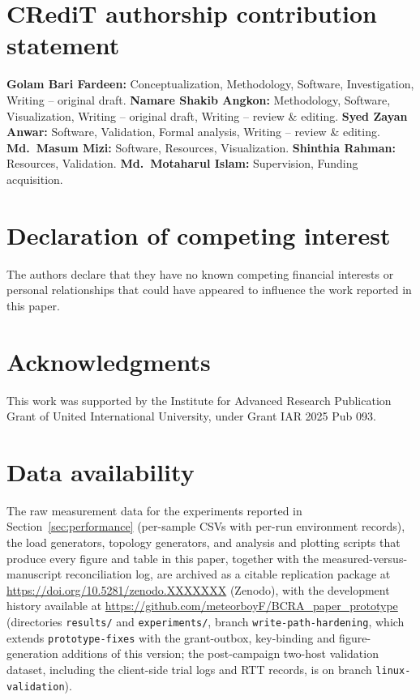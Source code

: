 \documentclass[preprint,12pt]{elsarticle}
\begin{document}
\section*{CRediT authorship contribution statement}
\textbf{Golam Bari Fardeen:} Conceptualization, Methodology, Software,
Investigation, Writing -- original draft.
\textbf{Namare Shakib Angkon:} Methodology, Software, Visualization,
Writing -- original draft, Writing -- review \& editing.
\textbf{Syed Zayan Anwar:} Software, Validation, Formal analysis,
Writing -- review \& editing.
\textbf{Md.\ Masum Mizi:} Software, Resources, Visualization.
\textbf{Shinthia Rahman:} Resources, Validation.
\textbf{Md.\ Motaharul Islam:} Supervision, Funding acquisition.

\section*{Declaration of competing interest}
The authors declare that they have no known competing financial interests
or personal relationships that could have appeared to influence the work
reported in this paper.

\section*{Acknowledgments}
This work was supported by the Institute for Advanced Research Publication
Grant of United International University, under Grant IAR 2025 Pub 093.

\section*{Data availability}
The raw measurement data for the experiments reported in
Section~\ref{sec:performance} (per-sample CSVs with per-run environment
records), the load generators, topology generators, and analysis and plotting
scripts that produce every figure and table in this paper, together with the
measured-versus-manuscript reconciliation log, are archived as a citable
replication package at
\url{https://doi.org/10.5281/zenodo.XXXXXXX} (Zenodo), with the
development history available at
\url{https://github.com/meteorboyF/BCRA_paper_prototype}
(directories \texttt{results/} and \texttt{experiments/}, branch
\texttt{write-path-hardening}, which extends \texttt{prototype-fixes} with the
grant-outbox, key-binding and figure-generation additions of this version; the
post-campaign two-host validation dataset, including the client-side trial
logs and RTT records, is on branch \texttt{linux-validation}).
\end{document}
